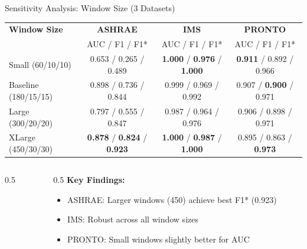 \documentclass[aspectratio=169,11pt]{beamer}
\begin{document}
\begin{frame}{Sensitivity Analysis: Window Size (3 Datasets)}
    \begin{table}[h]
        \centering
        \scriptsize
        \begin{tabular}{l|ccc}
            \toprule
            \textbf{Window Size} & \textbf{ASHRAE} & \textbf{IMS} & \textbf{PRONTO} \\
            & AUC / F1 / F1* & AUC / F1 / F1* & AUC / F1 / F1* \\
            \midrule
            Small (60/10/10) & 0.653 / 0.265 / 0.489 & \textbf{1.000} / \textbf{0.976} / \textbf{1.000} & \textbf{0.911} / 0.892 / 0.966 \\
            Baseline (180/15/15) & 0.898 / 0.736 / 0.844 & 0.999 / 0.969 / 0.992 & 0.907 / \textbf{0.900} / 0.971 \\
            Large (300/20/20) & 0.797 / 0.555 / 0.847 & 0.987 / 0.964 / 0.976 & 0.906 / 0.898 / 0.971 \\
            XLarge (450/30/30) & \textbf{0.878} / \textbf{0.824} / \textbf{0.923} & \textbf{1.000} / \textbf{0.987} / \textbf{1.000} & 0.895 / 0.863 / \textbf{0.973} \\
            \bottomrule
        \end{tabular}
    \end{table}

    \begin{columns}
        \begin{column}{0.5\textwidth}
        \end{column}
        \begin{column}{0.5\textwidth}
            \textbf{Key Findings:}
            \begin{itemize}
                \item ASHRAE: Larger windows (450) achieve best F1* (0.923)
                \item IMS: Robust across all window sizes
                \item PRONTO: Small windows slightly better for AUC
            \end{itemize}
        \end{column}
    \end{columns}
\end{frame}
\end{document}
